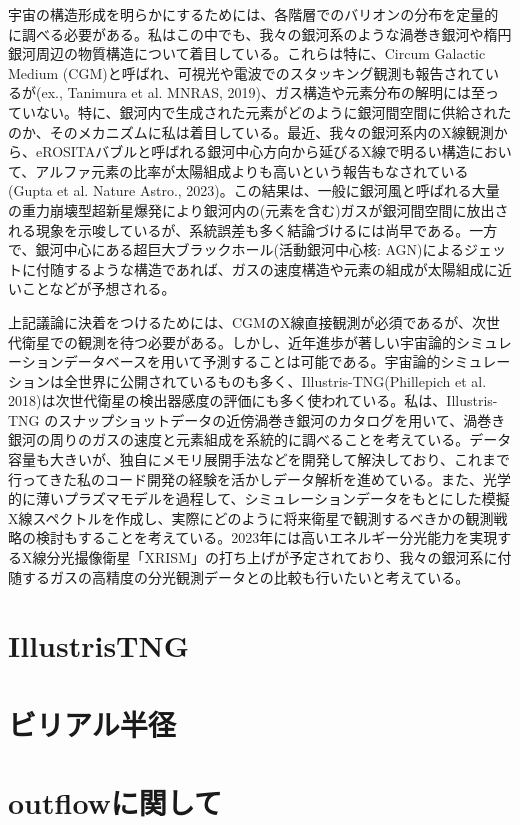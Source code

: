 宇宙の構造形成を明らかにするためには、各階層でのバリオンの分布を定量的に調べる必要がある。私はこの中でも、我々の銀河系のような渦巻き銀河や楕円銀河周辺の物質構造について着目している。これらは特に、Circum Galactic Medium (CGM)と呼ばれ、可視光や電波でのスタッキング観測も報告されているが(ex., Tanimura et al. MNRAS, 2019)、ガス構造や元素分布の解明には至っていない。特に、銀河内で生成された元素がどのように銀河間空間に供給されたのか、そのメカニズムに私は着目している。最近、我々の銀河系内のX線観測から、eROSITAバブルと呼ばれる銀河中心方向から延びるX線で明るい構造において、アルファ元素の比率が太陽組成よりも高いという報告もなされている(Gupta et al. Nature Astro., 2023)。この結果は、一般に銀河風と呼ばれる大量の重力崩壊型超新星爆発により銀河内の(元素を含む)ガスが銀河間空間に放出される現象を示唆しているが、系統誤差も多く結論づけるには尚早である。一方で、銀河中心にある超巨大ブラックホール(活動銀河中心核: AGN)によるジェットに付随するような構造であれば、ガスの速度構造や元素の組成が太陽組成に近いことなどが予想される。

上記議論に決着をつけるためには、CGMのX線直接観測が必須であるが、次世代衛星での観測を待つ必要がある。しかし、近年進歩が著しい宇宙論的シミュレーションデータベースを用いて予測することは可能である。宇宙論的シミュレーションは全世界に公開されているものも多く、Illustris-TNG(Phillepich et al. 2018)は次世代衛星の検出器感度の評価にも多く使われている。私は、Illustris-TNG のスナップショットデータの近傍渦巻き銀河のカタログを用いて、渦巻き銀河の周りのガスの速度と元素組成を系統的に調べることを考えている。データ容量も大きいが、独自にメモリ展開手法などを開発して解決しており、これまで行ってきた私のコード開発の経験を活かしデータ解析を進めている。また、光学的に薄いプラズマモデルを過程して、シミュレーションデータをもとにした模擬X線スペクトルを作成し、実際にどのように将来衛星で観測するべきかの観測戦略の検討もすることを考えている。2023年には高いエネルギー分光能力を実現するX線分光撮像衛星「XRISM」の打ち上げが予定されており、我々の銀河系に付随するガスの高精度の分光観測データとの比較も行いたいと考えている。

\section{IllustrisTNG}

\section{ビリアル半径}

\section{outflowに関して}